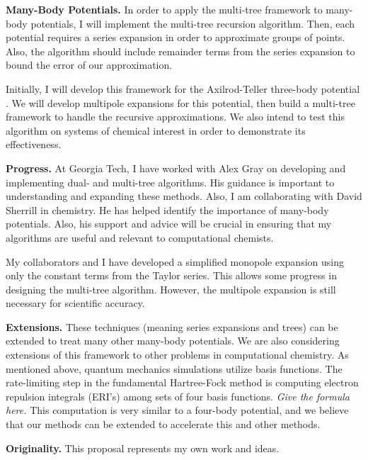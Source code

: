 \documentclass[twoside,leqno, 12pt]{article}
\begin{document}
\textbf{Many-Body Potentials.}  In order to apply the multi-tree framework to many-body potentials, I will implement the multi-tree recursion algorithm.  Then, each potential requires a series expansion in order to approximate groups of points.  Also, the algorithm should include remainder terms from the series expansion to bound the error of our approximation.

Initially, I will develop this framework for the Axilrod-Teller three-body potential \cite{axilrod_teller}.  We will develop multipole expansions for this potential, then build a multi-tree framework to handle the recursive approximations.  We also intend to test this algorithm on systems of chemical interest in order to demonstrate its effectiveness.  

\textbf{Progress.}
At Georgia Tech, I have worked with Alex Gray on developing and implementing dual- and multi-tree algorithms.  His guidance is important to understanding and expanding these methods.  Also, I am collaborating with David Sherrill in chemistry.  He has helped identify the importance of many-body potentials.  Also, his support and advice will be crucial in ensuring that my algorithms are useful and relevant to computational chemists.  

My collaborators and I have developed a simplified monopole expansion using only the constant terms from the Taylor series.  This allows some progress in designing the multi-tree algorithm.  However, the multipole expansion is still necessary for scientific accuracy.  

\textbf{Extensions.}  These techniques (meaning series expansions and trees) can be extended to treat many other many-body potentials.  We are also considering extensions of this framework to other problems in computational chemistry.  As mentioned above, quantum mechanics simulations utilize basis functions.  The rate-limiting step in the fundamental Hartree-Fock method is computing electron repulsion integrals (ERI's) among sets of four basis functions.  \textit{Give the formula here.}  This computation is very similar to a four-body potential, and we believe that our methods can be extended to accelerate this and other methods.

\textbf{Originality.}  This proposal represents my own work and ideas.





\end{document}
